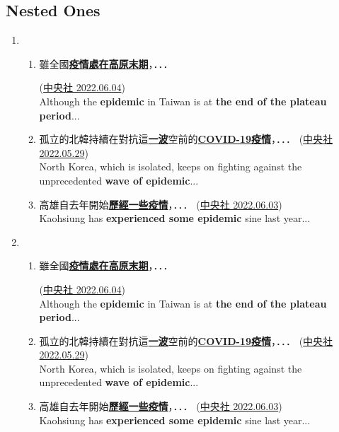 \subsection{Nested Ones}    
      
    \begin{enumerate}[resume, label = (\arabic*)] 
        \item \ 
            \begin{enumerate}[label = \alph*.]
                \item \hypertarget{sixteenth}{雖全國\underline{\textbf{疫情處在高原末期}}，．．．}(\href{https://www.cna.com.tw/news/ahel/202206040137.aspx}{中央社 2022.06.04}) \\
                Although the \textbf{epidemic} in Taiwan is at \textbf{the end of the plateau period}...
                \item 孤立的北韓持續在對抗這\underline{\textbf{一波}}空前的\underline{\textbf{COVID-19疫情}}，．．． (\href{https://www.cna.com.tw/news/aopl/202205290137.aspx}{中央社 2022.05.29}) \\
                North Korea, which is isolated, keeps on fighting against the unprecedented \textbf{wave of epidemic}...
                \item 高雄自去年開始\underline{\textbf{歷經一些疫情}}，．．． (\href{https://www.cna.com.tw/news/aloc/202206030194.aspx}{中央社 2022.06.03}) \\
                Kaohsiung has \textbf{experienced some epidemic} sine last year...
            \end{enumerate}
        \item \ 
            \begin{enumerate}[label = \alph*.]
               \item \hypertarget{sixteenth}{雖全國\underline{\textbf{疫情處在高原末期}}，．．．}(\href{https://www.cna.com.tw/news/ahel/202206040137.aspx}{中央社 2022.06.04}) \\
                Although the \textbf{epidemic} in Taiwan is at \textbf{the end of the plateau period}...
                \item 孤立的北韓持續在對抗這\underline{\textbf{一波}}空前的\underline{\textbf{COVID-19疫情}}，．．． (\href{https://www.cna.com.tw/news/aopl/202205290137.aspx}{中央社 2022.05.29}) \\
                North Korea, which is isolated, keeps on fighting against the unprecedented \textbf{wave of epidemic}...
                \item 高雄自去年開始\underline{\textbf{歷經一些疫情}}，．．． (\href{https://www.cna.com.tw/news/aloc/202206030194.aspx}{中央社 2022.06.03}) \\
                Kaohsiung has \textbf{experienced some epidemic} sine last year...
            \end{enumerate}
    \end{enumerate}
    

